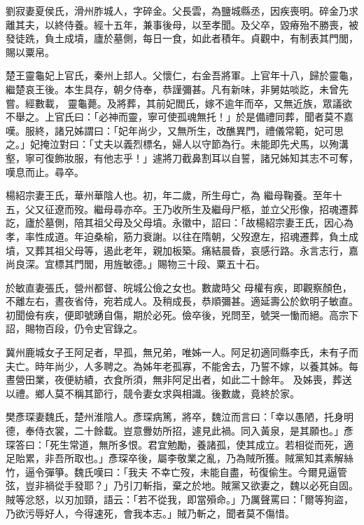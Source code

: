 \begin{pinyinscope}
 劉寂妻夏侯氏，滑州胙城人，字碎金。父長雲，為鹽城縣丞，因疾喪明。碎金乃求離其夫，以終侍養。經十五年，兼事後母，以至孝聞。及父卒，毀瘠殆不勝喪，被發徒跣，負土成墳，廬於墓側，每日一食，如此者積年。貞觀中，有制表其門閭，賜以粟帛。



 楚王靈龜妃上官氏，秦州上邽人。父懷仁，右金吾將軍。上官年十八，歸於靈龜，繼楚哀王後。本生具存，朝夕侍奉，恭謹彌甚。凡有新味，非舅姑啖訖，未曾先嘗。經數載，
 靈龜薨。及將葬，其前妃閻氏，嫁不逾年而卒，又無近族，眾議欲不舉之。上官氏曰：「必神而靈，寧可使孤魂無托！」於是備禮同葬，聞者莫不嘉嘆。服終，諸兄姊謂曰：「妃年尚少，又無所生，改醮異門，禮儀常範，妃可思之。」妃掩泣對曰：「丈夫以義烈標名，婦人以守節為行。未能即先犬馬，以殉溝壑，寧可復飾妝服，有他志乎！」遽將刀截鼻割耳以自誓，諸兄姊知其志不可奪，嘆息而止。尋卒。



 楊紹宗妻王氏，華州華陰人也。初，年二歲，所生母亡，為
 繼母鞠養。至年十五，父又征遼而歿。繼母尋亦卒。王乃收所生及繼母尸柩，並立父形像，招魂遷葬訖，廬於墓側，陪其祖父母及父母墳。永徽中，詔曰：「故楊紹宗妻王氏，因心為孝，率性成道。年迫桑榆，筋力衰謝。以往在隋朝，父歿遼左，招魂遷葬，負土成墳，又葬其祖父母等，遏此老年，親加板築。痛結晨昏，哀感行路。永言志行，嘉尚良深。宜標其門閭，用旌敏德。」賜物三十段、粟五十石。



 於敏直妻張氏，營州都督、皖城公儉之女也。數歲時父
 母權有疾，即觀察顏色，不離左右，晝夜省侍，宛若成人。及稍成長，恭順彌甚。適延壽公於欽明子敏直。初聞儉有疾，便即號踴自傷，期於必死。儉卒後，兇問至，號哭一慟而絕。高宗下詔，賜物百段，仍令史官錄之。



 冀州鹿城女子王阿足者，早孤，無兄弟，唯姊一人。阿足初適同縣李氏，未有子而夫亡。時年尚少，人多聘之。為姊年老孤寡，不能舍去，乃誓不嫁，以養其姊。每晝營田業，夜便紡績，衣食所須，無非阿足出者，如此二十餘年。
 及姊喪，葬送以禮。鄉人莫不稱其節行，競令妻女求與相識。後數歲，竟終於家。



 樊彥琛妻魏氏，楚州淮陰人。彥琛病篤，將卒，魏泣而言曰：「幸以愚陋，托身明德，奉侍衣裳，二十餘載。豈意釁妨所招，遽見此禍。同入黃泉，是其願也。」彥琛答曰：「死生常道，無所多恨。君宜勉勵，養諸孤，使其成立。若相從而死，適足貽累，非吾所取也。」彥琛卒後，屬李敬業之亂，乃為賊所獲。賊黨知其素解絲竹，逼令彈箏。魏氏嘆曰：「我夫
 不幸亡歿，未能自盡，茍復偷生。今爾見逼管弦，豈非禍從手發耶？」乃引刀斬指，棄之於地。賊黨又欲妻之，魏以必死自固。賊等忿怒，以刃加頸，語云：「若不從我，即當殞命。」乃厲聲罵曰：「爾等狗盜，乃欲污辱好人，今得速死，會我本志。」賊乃斬之，聞者莫不傷惜。




\end{pinyinscope}
